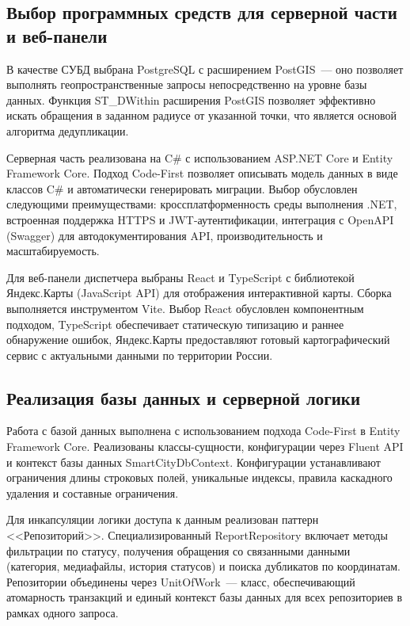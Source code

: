 \subsection{Выбор программных средств для серверной части и веб-панели}

В качестве СУБД выбрана PostgreSQL с расширением PostGIS~--- оно позволяет выполнять геопространственные запросы непосредственно на уровне базы данных. Функция ST\_DWithin расширения PostGIS позволяет эффективно искать обращения в заданном радиусе от указанной точки, что является основой алгоритма дедупликации.

Серверная часть реализована на C\# с использованием ASP.NET Core и Entity Framework Core. Подход Code-First позволяет описывать модель данных в виде классов C\# и автоматически генерировать миграции. Выбор обусловлен следующими преимуществами: кроссплатформенность среды выполнения .NET, встроенная поддержка HTTPS и JWT-аутентификации, интеграция с OpenAPI (Swagger) для автодокументирования API, производительность и масштабируемость.

Для веб-панели диспетчера выбраны React и TypeScript с библиотекой Яндекс.Карты (JavaScript API) для отображения интерактивной карты. Сборка выполняется инструментом Vite. Выбор React обусловлен компонентным подходом, TypeScript обеспечивает статическую типизацию и раннее обнаружение ошибок, Яндекс.Карты предоставляют готовый картографический сервис с актуальными данными по территории России.

\subsection{Реализация базы данных и серверной логики}

Работа с базой данных выполнена с использованием подхода Code-First в Entity Framework Core. Реализованы классы-сущности, конфигурации через Fluent API и контекст базы данных SmartCityDbContext. Конфигурации устанавливают ограничения длины строковых полей, уникальные индексы, правила каскадного удаления и составные ограничения.

Для инкапсуляции логики доступа к данным реализован паттерн <<Репозиторий>>. Специализированный ReportRepository включает методы фильтрации по статусу, получения обращения со связанными данными (категория, медиафайлы, история статусов) и поиска дубликатов по координатам. Репозитории объединены через UnitOfWork~--- класс, обеспечивающий атомарность транзакций и единый контекст базы данных для всех репозиториев в рамках одного запроса.

